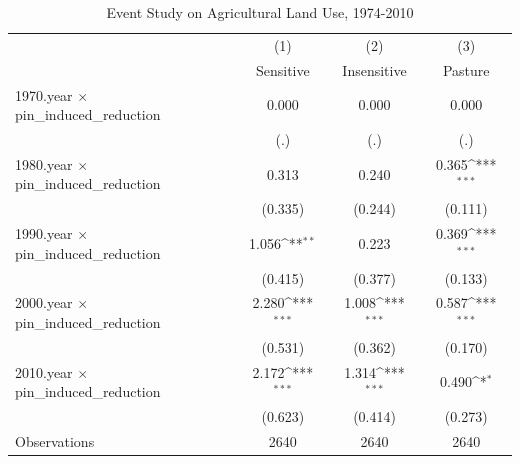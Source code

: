 \begin{table}[htbp]\centering
\def\sym#1{\ifmmode^{#1}\else\(^{#1}\)\fi}
\caption{Event Study on Agricultural Land Use, 1974-2010}
\begin{tabular}{l*{3}{c}}
\hline\hline
                    &\multicolumn{1}{c}{(1)}         &\multicolumn{1}{c}{(2)}         &\multicolumn{1}{c}{(3)}         \\
                    &   Sensitive         & Insensitive         &     Pasture         \\
\hline
1970.year $\times$ pin\_induced\_reduction&       0.000         &       0.000         &       0.000         \\
                    &         (.)         &         (.)         &         (.)         \\
1980.year $\times$ pin\_induced\_reduction&       0.313         &       0.240         &       0.365\sym{***}\\
                    &     (0.335)         &     (0.244)         &     (0.111)         \\
1990.year $\times$ pin\_induced\_reduction&       1.056\sym{**} &       0.223         &       0.369\sym{***}\\
                    &     (0.415)         &     (0.377)         &     (0.133)         \\
2000.year $\times$ pin\_induced\_reduction&       2.280\sym{***}&       1.008\sym{***}&       0.587\sym{***}\\
                    &     (0.531)         &     (0.362)         &     (0.170)         \\
2010.year $\times$ pin\_induced\_reduction&       2.172\sym{***}&       1.314\sym{***}&       0.490\sym{*}  \\
                    &     (0.623)         &     (0.414)         &     (0.273)         \\
\hline
Observations        &        2640         &        2640         &        2640         \\
\hline\hline
\end{tabular}
\end{table}
